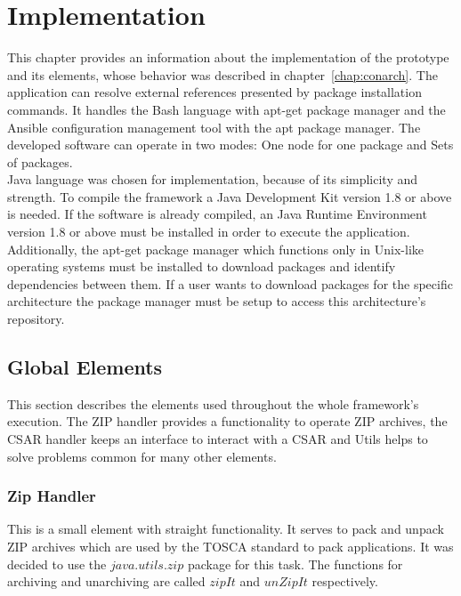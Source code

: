 
\chapter{Implementation}\label{chap:imp}
This chapter provides an information about the implementation of the prototype and its elements, whose behavior was described in chapter~\ref{chap:conarch}.
The application can resolve external references presented by package installation commands.
It handles the Bash language with apt-get package manager and the Ansible configuration management tool with the apt package manager.
The developed software can operate in two modes: One node for one package and Sets of packages.\\
Java language was chosen for implementation, because of its simplicity and strength. 
To compile the framework a Java Development Kit version 1.8 or above is needed.
If the software is already compiled, an Java Runtime Environment version 1.8 or above must be installed in order to execute the application.
Additionally, the apt-get package manager which functions only in Unix-like operating systems must be installed to download packages and identify dependencies between them. 
If a user wants to download packages for the specific architecture the package manager must be setup to access this architecture's repository. 

%



\section{Global Elements}
This section describes the elements used throughout the whole framework's execution.
The ZIP handler provides a functionality to operate ZIP archives, the CSAR handler keeps an interface to interact with a CSAR and Utils helps to solve problems common for many other elements.

\subsection*{Zip Handler}
This is a small element with straight functionality. 
It serves to pack and unpack ZIP archives which are used by the TOSCA standard to pack applications.
It was decided to use the $java$.$utils$.$zip$ package for this task.
The functions for archiving and unarchiving are called $zipIt$ and $unZipIt$ respectively. 

